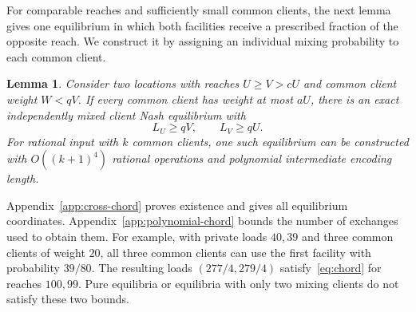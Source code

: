 \documentclass[11pt]{amsart}
\numberwithin{equation}{section}
\newtheorem{lemma}[theorem]{Lemma}
\theoremstyle{definition}
\begin{document}
For comparable reaches and sufficiently small common clients, the next lemma gives one equilibrium in which both facilities receive a prescribed fraction of the opposite reach. We construct it by assigning an individual mixing probability to each common client.
\begin{lemma}\label{lem:chord}
Consider two locations with reaches $U\ge V>cU$ and common client weight $W<qV$. If every common client has weight at most $aU$, there is an exact independently mixed client Nash equilibrium with
\begin{equation}\label{eq:chord}
 L_U\ge qV,\qquad L_V\ge qU.
\end{equation}
For rational input with $k$ common clients, one such equilibrium can be constructed with $O((k+1)^4)$ rational operations and polynomial intermediate encoding length.
\end{lemma}
Appendix~\ref{app:cross-chord} proves existence and gives all equilibrium coordinates. Appendix~\ref{app:polynomial-chord} bounds the number of exchanges used to obtain them. For example, with private loads $40,39$ and three common clients of weight $20$, all three common clients can use the first facility with probability $39/80$. The resulting loads $(277/4,279/4)$ satisfy~\eqref{eq:chord} for reaches $100,99$. Pure equilibria or equilibria with only two mixing clients do not satisfy these two bounds.
\end{document}
